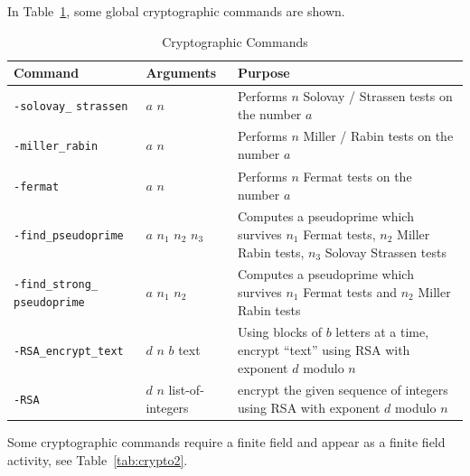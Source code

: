 In Table~\ref{tab:crypto}, some global cryptographic commands are shown.
\begin{table}
	\begin{center}
	\begin{tabular}{|p{4cm}|p{3cm}|p{7cm}|}
		\hline
		Command & Arguments & Purpose \\
		\hline
		\verb'-solovay_' \verb'strassen' & $a$ $n$  & Performs $n$ Solovay / Strassen tests on the number $a$\\
		\hline
		\verb'-miller_rabin' & $a$ $n$  & Performs $n$ Miller / Rabin tests on the number $a$\\
		\hline
		\verb'-fermat' & $a$ $n$  & Performs $n$ Fermat tests on the number $a$\\
		\hline
		\verb'-find_pseudoprime' & $a$ $n_1$ $n_2$ $n_3$  & Computes a pseudoprime which survives $n_1$ Fermat tests, $n_2$ Miller Rabin tests, $n_3$ Solovay Strassen tests\\
		\hline
		\verb'-find_strong_' \verb'pseudoprime' & $a$ $n_1$ $n_2$  & Computes a pseudoprime which survives $n_1$ Fermat tests and  $n_2$ Miller Rabin tests \\
		\hline
		\verb'-RSA_encrypt_text' & $d$ $n$ $b$ text & Using blocks of $b$ letters at a time, encrypt ``text'' using RSA with exponent $d$ modulo $n$\\
		\hline
		\verb'-RSA' & $d$ $n$  list-of-integers & encrypt the given sequence of integers using RSA with exponent $d$ modulo $n$\\
		\hline
\end{tabular}
\end{center}
\caption{\label{tab:crypto}Cryptographic Commands}
\end{table}
Some cryptographic commands require a finite field and appear as a finite field activity, see Table~\ref{tab:crypto2}.
